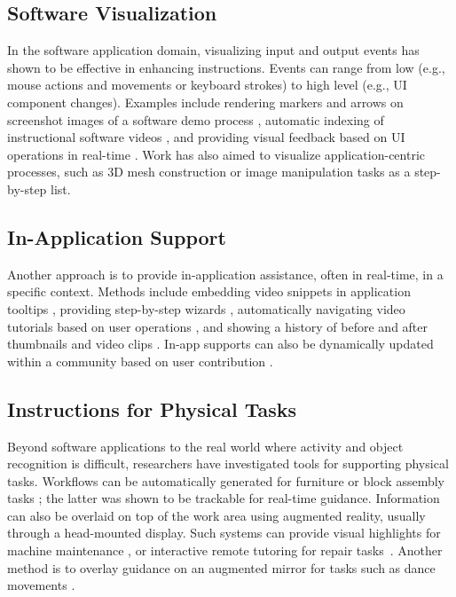 \subsection{Software Visualization}
In the software application domain, visualizing input and output events has shown to be effective in enhancing instructions. Events can range from low (e.g., mouse actions and movements or keyboard strokes) to high level (e.g., UI component changes). Examples include rendering markers and arrows on screenshot images of a software demo process \cite{Nakamura:2008:ASV:1449715.1449721, Grabler:2009jj}, automatic indexing of instructional software videos \cite{Banovic:2012kd}, and providing visual feedback based on UI operations in real-time \cite{Dixon:2010fb,Dixon:2011:CHP:1978942.1979086}. Work has also aimed to visualize application-centric processes, such as 3D mesh construction \cite{Denning:2011fy} or image manipulation tasks \cite{Grabler:2009jj} as a step-by-step list.

\subsection{In-Application Support}

Another approach is to provide in-application assistance, often in real-time, in a specific context. Methods include embedding video snippets in application tooltips \cite{Grossman:2010wr}, providing step-by-step wizards \cite{Bergman05docwizards:a,Kelleher:2005:STD:1054972.1055047,Fernquist:2011:SRE:2047196.2047245}, automatically navigating video tutorials based on user operations \cite{Pongnumkul:2011ju}, and showing a history of before and after thumbnails and video clips \cite{Grossman:2010jz}. In-app supports can also be dynamically updated within a community based on user contribution \cite{Lafreniere:2013ff,Matejka:2009:CCR:1622176.1622214}.

\subsection{Instructions for Physical Tasks}

Beyond software applications to the real world where activity and object recognition is difficult, researchers have investigated tools for supporting physical tasks. Workflows can be automatically generated for furniture \cite{agrawala2003designing} or block assembly tasks \cite{Gupta:2012ku}; the latter was shown to be trackable for real-time guidance.
%
Information can also be overlaid on top of the work area using augmented reality, usually through a head-mounted display. Such systems can provide visual highlights for machine maintenance \cite{Henderson:2011ff}, or interactive remote tutoring for repair tasks~\cite{Gurevich:2012ko}. Another method is to overlay guidance on an augmented mirror for tasks such as dance movements \cite{Anderson:2013:YEM:2501988.2502045}.

